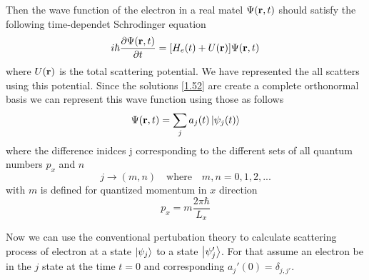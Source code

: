 \documentclass[a4paper]{article}
\numberwithin{equation}{subsection}
\numberwithin{equation}{section}
\begin{document}
\noindent
Then the wave function of the electron in a real matel $\Psi(\vb{r},t)$ should satisfy the following time-dependet Schrodinger equation
\begin{equation} \label{2.1}
  i \hbar \pdv{\Psi(\vb{r},t)}{t} = [H_e(t) + U(\vb{r})] \Psi(\vb{r},t)
\end{equation}
where $U(\vb{r})$ is the total scattering potential. We have represented the all scatters using this potential. Since the solutions \eqref{1.52} are create a complete orthonormal basis we can represent this wave function using those as follows
\begin{equation} \label{2.2}
  \Psi(\vb{r},t) = \sum_j a_j(t) \ket{\psi_j(t)}
\end{equation}
where the difference inidces j corresponding to the different sets of all quantum numbers $p_x$ and $n$
\begin{equation} \label{2.3}
  j \rightarrow (m,n) \quad \text{where} \quad
  m,n =0,1,2,...
\end{equation}
with $m$ is defined for quantized momentum in $x$ direction
\begin{equation} \label{2.4}
  p_x = m \frac{2\pi \hbar}{L_x}
\end{equation}

\noindent
Now we can use the conventional pertubation theory to calculate scattering process of electron at a state $\ket{\psi_j}$ to a state $\ket{\psi_j'}$. For that assume an electron be in the $j$ state at the time $t=0$ and corresponding $a_j'(0) = \delta_{j,j'}$.
\end{document}
